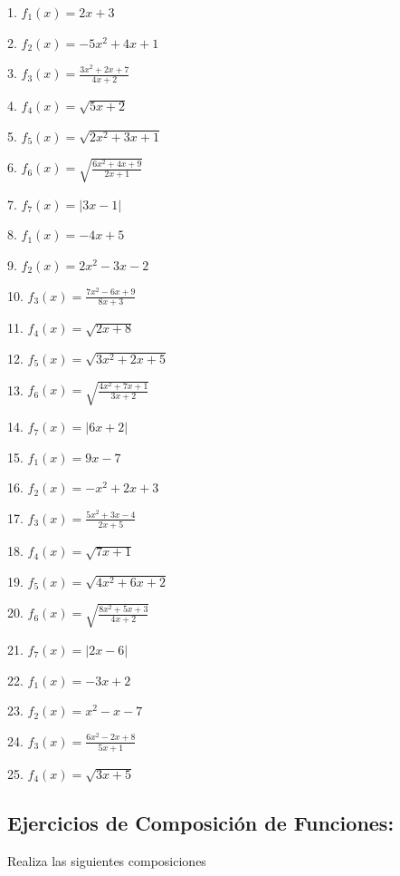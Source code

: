 \documentclass[]{book}
\begin{document}
\begin{multicols}{2}
    1. $f_1(x) = 2x + 3$

    2. $f_2(x) = -5x^2 + 4x + 1$

    3. $f_3(x) = \frac{3x^2 + 2x + 7}{4x + 2}$

    4. $f_4(x) = \sqrt{5x + 2}$

    5. $f_5(x) = \sqrt{2x^2 + 3x + 1}$

    6. $f_6(x) = \sqrt{\frac{6x^2 + 4x + 9}{2x + 1}}$

    7. $f_7(x) = |3x - 1|$

    8. $f_1(x) = -4x + 5$

    9. $f_2(x) = 2x^2 - 3x - 2$

    10. $f_3(x) = \frac{7x^2 - 6x + 9}{8x + 3}$

    11. $f_4(x) = \sqrt{2x + 8}$

    12. $f_5(x) = \sqrt{3x^2 + 2x + 5}$

    13. $f_6(x) = \sqrt{\frac{4x^2 + 7x + 1}{3x + 2}}$

    14. $f_7(x) = |6x + 2|$

    15. $f_1(x) = 9x - 7$

    16. $f_2(x) = -x^2 + 2x + 3$

    17. $f_3(x) = \frac{5x^2 + 3x - 4}{2x + 5}$

    18. $f_4(x) = \sqrt{7x + 1}$

    19. $f_5(x) = \sqrt{4x^2 + 6x + 2}$

    20. $f_6(x) = \sqrt{\frac{8x^2 + 5x + 3}{4x + 2}}$

    21. $f_7(x) = |2x - 6|$

    22. $f_1(x) = -3x + 2$

    23. $f_2(x) = x^2 - x - 7$

    24. $f_3(x) = \frac{6x^2 - 2x + 8}{5x + 1}$

    25. $f_4(x) = \sqrt{3x + 5}$
    
\end{multicols}

\subsection{Ejercicios de Composición de
Funciones:}\label{ejercicios-de-composiciuxf3n-de-funciones}

Realiza las siguientes composiciones
\end{document}
